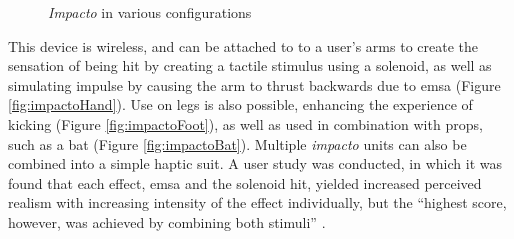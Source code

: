 \begin{figure}[h]
    \centering
    \hfill
    \hfill
    \caption{\textit{Impacto} in various configurations \autocite{impacto}}
    \label{fig:impactoConfigs}
\end{figure}

This device is wireless, and can be attached to to a user's arms to create the sensation of being hit by creating a tactile stimulus using a solenoid, as well as simulating impulse by causing the arm to thrust backwards due to \gls{emsa} (Figure \autoref{fig:impactoHand}). Use on legs is also possible, enhancing the experience of kicking (Figure \autoref{fig:impactoFoot}), as well as used in combination with props, such as a bat (Figure \autoref{fig:impactoBat}). Multiple \textit{impacto} units can also be combined into a simple haptic suit.
\newline
A user study was conducted, in which it was found that each effect, \gls{emsa} and the solenoid hit, yielded increased perceived realism with increasing intensity of the effect individually, but the \enquote{highest
score, however, was achieved by combining both stimuli} \autocite[p. ~8]{impacto}.


